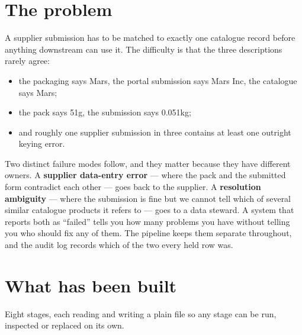 \section{The problem}

A supplier submission has to be matched to exactly one catalogue record before
anything downstream can use it. The difficulty is that the three descriptions
rarely agree:

\begin{itemize}
  \item the packaging says \textsf{Mars}, the portal submission says
        \textsf{Mars Inc}, the catalogue says \textsf{Mars};
  \item the pack says \textsf{51g}, the submission says \textsf{0.051kg};
  \item and roughly one supplier submission in three contains at least one
        outright keying error.
\end{itemize}

Two distinct failure modes follow, and they matter because they have different
owners. A \textbf{supplier data-entry error} --- where the pack and the submitted
form contradict each other --- goes back to the supplier. A \textbf{resolution
ambiguity} --- where the submission is fine but we cannot tell which of several
similar catalogue products it refers to --- goes to a data steward. A system that
reports both as ``failed'' tells you how many problems you have without telling
you who should fix any of them. The pipeline keeps them separate throughout, and
the audit log records which of the two every held row was.

\section{What has been built}

Eight stages, each reading and writing a plain file so any stage can be run,
inspected or replaced on its own.

